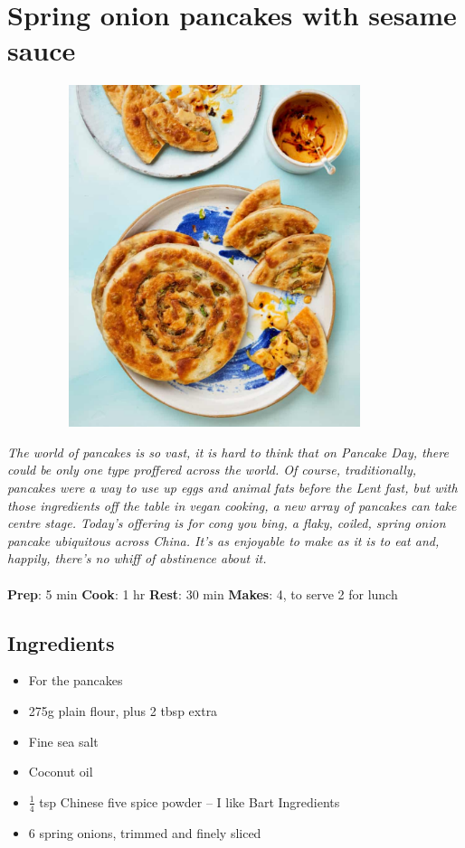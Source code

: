 \documentclass{book}
\begin{document}
\section{Spring onion pancakes with sesame sauce}
\begin{figure}
\centering\includegraphics[width=10cm,height=10cm,keepaspectratio]{Recipe_Pictures/Spring_onion_pancakes_with_sesame_sauce.png}
\end{figure}
\emph{ The world of pancakes is so vast, it is hard to think that on Pancake Day, there could be only one type proffered across the world. Of course, traditionally, pancakes were a way to use up eggs and animal fats before the Lent fast, but with those ingredients off the table in vegan cooking, a new array of pancakes can take centre stage. Today’s offering is for cong you bing, a flaky, coiled, spring onion pancake ubiquitous across China. It’s as enjoyable to make as it is to eat and, happily, there’s no whiff of abstinence about it.}\\\\ 
\textbf{Prep}: 5 min
\textbf{Cook}: 1 hr
\textbf{Rest}: 30 min
\textbf{Makes}: 4, to serve 2 for lunch
\subsection*{Ingredients}
\begin{itemize}
\item For the pancakes
\item 275g plain flour, plus 2 tbsp extra
\item Fine sea salt
\item Coconut oil
\item $\frac{1}{4}$ tsp Chinese five spice powder – I like Bart Ingredients 
\item 6 spring onions, trimmed and finely sliced
\end{itemize}
\end{document}
